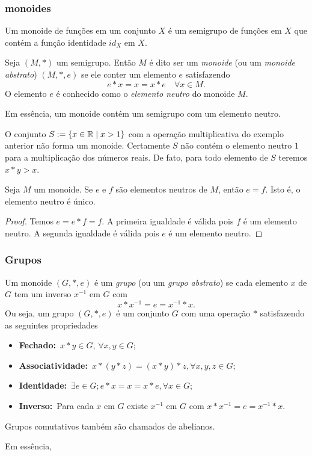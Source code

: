 \begin{definition}[Magma]
      \subsubsection{monoides}
         Um monoide de funções em um conjunto $X$ é um semigrupo de funções em $X$ que contém a função identidade $id_{X}$ em $X$.
         \begin{definition}
            Seja $(M, *)$ um semigrupo. Então $M$ é dito ser um \emph{monoide} (ou um \emph{monoide abstrato}) $(M, *, e)$ se ele conter um elemento $e$ satisfazendo $$e * x = x = x * e\quad \forall x \in M.$$ O elemento $e$ é conhecido como o \textit{elemento neutro} do monoide $M$.
         \end{definition}
         Em essência, um monoide contém um semigrupo com um elemento neutro.
         \begin{exmp}
            O conjunto $S := \{x \in \mathbb{R} \mid x > 1\}$ com a operação multiplicativa do exemplo anterior não forma um monoide. Certamente $S$ não contém o elemento neutro $1$ para a multiplicação dos números reais. De fato, para todo elemento de $S$ teremos $x * y > x$.
         \end{exmp}
         \begin{stat}
            Seja $M$ um monoide. Se $e$ e $f$ são elementos neutros de $M$, então $e=f$. Isto é, o elemento neutro é único.
            \begin{proof}
               Temos $e = e * f = f$. A primeira igualdade é válida pois $f$ é um elemento neutro. A segunda igualdade é válida pois $e$ é um elemento neutro.
            \end{proof}
         \end{stat}

      \subsubsection{Grupos}
         \begin{definition}
            Um monoide $(G, * , e)$ é um \emph{grupo} (ou um \emph{grupo abstrato}) se cada elemento $x$ de $G$ tem um inverso $x^{-1}$ em $G$ com $$x * x^{-1} = e = x^{-1} * x.$$
            Ou seja, um grupo $(G,* , e)$ é um conjunto $G$ com uma operação $*$ satisfazendo as seguintes propriedades
            \begin{itemize}
               \item \textbf{Fechado:}\ $x* y \in G$, $\forall x,y \in G$;
               \item \textbf{Associatividade:}\ $x * (y* z) = (x* y) * z, \forall x,y,z \in G$;
               \item \textbf{Identidade:}\ $\exists e \in G; e* x = x = x* e, \forall x \in G$;
               \item \textbf{Inverso:}\ Para cada $x$ em $G$ existe $x^{-1}$ em $G$ com $x* x^{-1} = e = x^{-1} * x$.
            \end{itemize}
            Grupos comutativos também são chamados de abelianos.
         \end{definition}
         Em essência, 


\end{definition}
